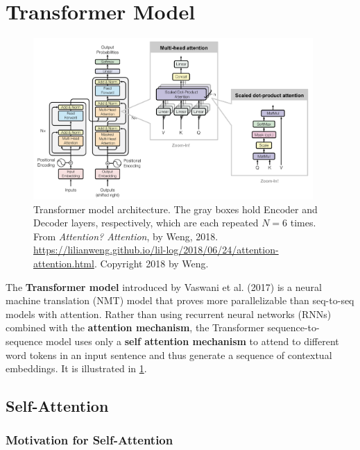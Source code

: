 \section{Transformer Model} \label{sec:Transformer}

\begin{figure}[h]
\vspace{-10pt}
\centering
\includegraphics[width=0.95\textwidth]{imgs/transformer.png}
\vspace{-10pt}
\caption{\footnotesize Transformer model architecture. The gray boxes hold Encoder and Decoder layers, respectively, which are each repeated $N=6$ times. From \emph{Attention? Attention}, by Weng, 2018. \url{https://lilianweng.github.io/lil-log/2018/06/24/attention-attention.html}. Copyright 2018 by Weng.}
\vspace{-5pt}
\label{fig:transformer}
\end{figure}

The \textbf{Transformer model} introduced by Vaswani et al. (2017) is a neural machine translation (NMT) model that proves more parallelizable than seq-to-seq models with attention. Rather than using recurrent neural networks (RNNs) combined with the \textbf{attention mechanism}, the Transformer sequence-to-sequence model uses only a \textbf{self attention mechanism} to attend to different word tokens in an input sentence and thus generate a sequence of contextual embeddings. It is illustrated in \cref{fig:transformer}.





\subsection{Self-Attention} \label{sec:SelfAttention}

\subsubsection{Motivation for Self-Attention}

